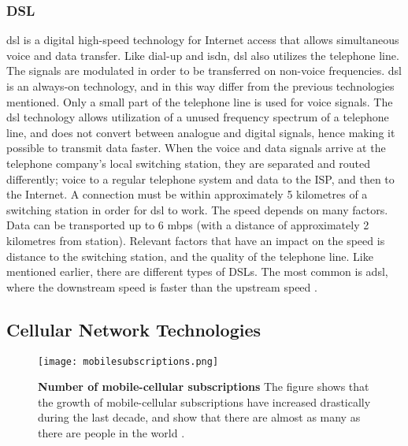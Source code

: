\subsubsection{DSL}
\gls{dsl} is a digital high-speed technology for Internet access that allows simultaneous voice and data transfer. Like dial-up and \gls{isdn}, \gls{dsl} also utilizes the telephone line. The signals are modulated in order to be transferred on non-voice frequencies. \gls{dsl} is an always-on technology, and in this way differ from the previous technologies mentioned. Only a small part of the telephone line is used for voice signals. The \gls{dsl} technology allows utilization of a unused frequency spectrum of a telephone line, and does not convert between analogue and digital signals, hence making it possible to transmit data faster. When the voice and data signals arrive at the telephone company's local switching station, they are separated and routed differently; voice to a regular telephone system and data to the ISP, and then to the Internet. A connection must be within approximately 5 kilometres of a  switching station in order for \gls{dsl} to work. The speed depends on many factors. Data can be transported up to 6 \gls{mbps} (with a distance of approximately 2 kilometres from station). Relevant factors that have an impact on the speed is distance to the switching station, and the quality of the telephone line. Like mentioned earlier, there are different types of DSLs. The most common is \gls{adsl}, where the downstream speed is faster than the upstream speed \cite{differentuplinks}.



\subsection{Cellular Network Technologies}

\begin{figure}[t]
  \centering
      \texttt{[image: mobilesubscriptions.png]}
  \caption [Number of mobile-cellular subscriptions]{\textbf{Number of mobile-cellular subscriptions} The figure shows that the growth of mobile-cellular subscriptions have increased drastically during the last decade, and show that there are almost as many as there are people in the world \cite{itu2013}.}
  \label{fig:subscribers}
\end{figure}

